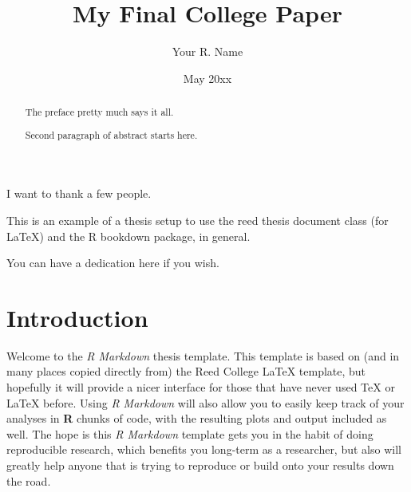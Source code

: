 \documentclass[12pt,twoside]{reedthesis}
\title{My Final College Paper}
\author{Your R. Name}
\date{May 20xx}
\theoremstyle{definition}
\theoremstyle{definition}
\theoremstyle{definition}
\theoremstyle{remark}
\begin{document}
  \maketitle

\frontmatter %
\pagestyle{empty} %
  \begin{acknowledgements}
    I want to thank a few people.
  \end{acknowledgements}
  \begin{preface}
    This is an example of a thesis setup to use the reed thesis document
    class (for LaTeX) and the R bookdown package, in general.
  \end{preface}
  \hypersetup{linkcolor=black}
  \setcounter{tocdepth}{2}
  \tableofcontents

  \listoftables

  \listoffigures
  \begin{abstract}
    The preface pretty much says it all.
    
    \par
    
    Second paragraph of abstract starts here.
  \end{abstract}
  \begin{dedication}
    You can have a dedication here if you wish.
  \end{dedication}
\mainmatter %
\pagestyle{fancyplain} %

\hypertarget{introduction}{%
\chapter*{Introduction}\label{introduction}}

Welcome to the \emph{R Markdown} thesis template. This template is based
on (and in many places copied directly from) the Reed College LaTeX
template, but hopefully it will provide a nicer interface for those that
have never used TeX or LaTeX before. Using \emph{R Markdown} will also
allow you to easily keep track of your analyses in \textbf{R} chunks of
code, with the resulting plots and output included as well. The hope is
this \emph{R Markdown} template gets you in the habit of doing
reproducible research, which benefits you long-term as a researcher, but
also will greatly help anyone that is trying to reproduce or build onto
your results down the road.
\end{document}
